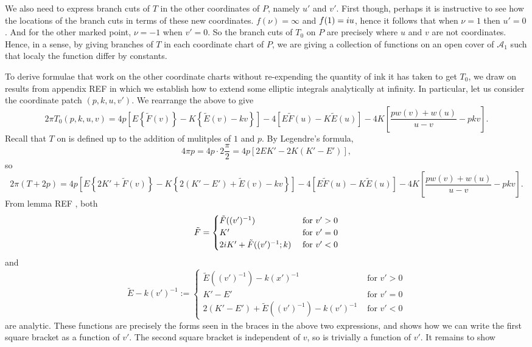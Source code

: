 We also need to express branch cuts of $T$ in the other coordinates of $P$, namely $u'$ and $v'$. First though, perhaps it is instructive to see how the locations of the branch cuts in terms of these new coordinates. $f(ν) = ∞$ and $f(1) = i u$, hence it follows that when $ν=1$ then $u' = 0$. And for the other marked point, $ν=-1$ when $v'=0$. So the branch cuts of $T_0$ on $P$ are precisely where $u$ and $v$ are not coordinates. Hence, in a sense, by giving branches of $T$ in each coordinate chart of $P$, we are giving a collection of functions on an open cover of $\mathcal{A}_1$ such that localy the function differ by constants.

To derive formulae that work on the other coordinate charts without re-expending the quantity of ink it has taken to get $T_0$, we draw on results from appendix REF  in which we establish how to extend some elliptic integrals analytically at infinity. In particular, let us consider the coordinate patch $(p,k,u,v')$. We rearrange the above to give
\[
2π T_0(p,k,u,v) = 4p \left[ E \left\{\tilde{F}(v)\right\} - K \left\{ \tilde{E}(v) - kv\right\} \right]
- 4 \left[ E \tilde{F}(u) - K \tilde{E}(u) \right]
- 4 K \left[\frac{p w(v) + w(u)}{u-v} - p k v \right] .
\]
Recall that $T$ on is defined up to the addition of mulitples of $1$ and $p$. By Legendre's formula,
\[
4π p = 4p\cdot 2\frac{π}{2}
= 4p \left[  2 E K' - 2 K (K' - E')  \right],
\]
so
\[
2π \left(T + 2p\right)
= 4p \left[ E \left\{2 K' + \tilde{F}(v)\right\} - K \left\{ 2(K'-E') + \tilde{E}(v) - kv\right\} \right]
- 4 \left[ E \tilde{F}(u) - K \tilde{E}(u) \right]
- 4 K \left[\frac{p w(v) + w(u)}{u-v} - p k v \right] .
\]
From lemma REF , both
\[
\tilde{F} =
\begin{cases}
\tilde F((v')^{-1})             & \text{ for } v' > 0 \\
K'                              & \text{ for } v' = 0 \\
2i K' + \tilde F((v')^{-1}; k)   & \text{ for } v' < 0
\end{cases}
\]
and
\[
\tilde{E} - k(v')^{-1} :=
\begin{cases}
\tilde E((v')^{-1}) - k(x')^{-1}                 & \text{ for } v' > 0 \\
K'-E'                                            & \text{ for } v' = 0 \\
2(K'-E') + \tilde E((v')^{-1})  - k(v')^{-1}     & \text{ for } v' < 0
\end{cases}
\]
are analytic. These functions are precisely the forms seen in the braces in the above two expressions, and shows how we can write the first square bracket as a function of $v'$. The second square bracket is independent of $v$, so is trivially a function of $v'$. It remains to show
